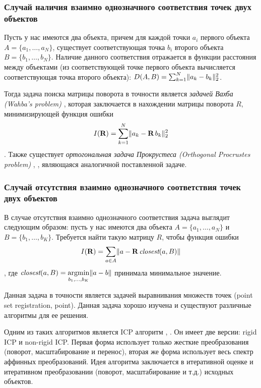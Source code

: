 \subsubsection{Случай наличия взаимно однозначного соответствия точек двух объектов}
Пусть у нас имеются два объекта, причем для каждой точки $a_{i}$ первого объекта $A = \{a_{1}, \ldots, a_{N}\}$, существует соответствующая точка $b_{i}$ второго объекта $B = \{b_{1}, \ldots, b_{N}\}$. Наличие данного соответствия отражается в функции расстояния между объектами (из соответствующей точке первого объекта вычисляется соответствующая точка второго объекта): $D(A, B) = \sum_{k=1}^{N}  \lVert a_{k} - b_{k}\rVert_{2}^{2}$. 

Тогда задача поиска матрицы поворота в точности является \textit{задачей Вахба (Wahba's problem)} \cite{wahba}, которая заключается в нахождении матрицы поворота $R$, минимизирующей функция ошибки \[I(\textbf{R}) = \sum_{k=1}^{N}  \lVert a_{k} - \textbf{R} \, b_{k}\rVert_{2}^{2} \]. Также существует \textit{ортогональная задача Прокрустеса (Orthogonal Procrustes problem)} \cite{procrustes-1}, \cite{procrustes-2}, являющаяся аналогичной поставленной задаче.

\subsubsection{Случай отсутствия взаимно однозначного соответствия точек двух объектов}

В случае отсутствия взаимно однозначного соответствия задача выглядит следующим образом: пусть у нас имеются два объекта $A = \{a_{1}, \ldots, a_{N}\}$ и $B = \{b_{1}, \ldots, b_{K}\}$. Требуется найти такую матрицу $R$, чтобы функция ошибки \[I(\textbf{R}) = \sum\limits_{a \in A} \lVert a - \textbf{R} \, \textit{closest}(a, B)\rVert \], где $\textit{closest}(a, B) = \operatorname*{argmin}\limits_{b_{1}, \dots , b_{K}} \lVert a - b\rVert$ принимала минимальное значение.


Данная задача в точности является задачей выравнивания множеств точек (point set registration, point). Данная задача хорошо изучена и существуют различные алгоритмы для ее решения.

Одним из таких алгоритмов является ICP алгоритм \cite{icp-main}, \cite{icp-2}. Он имеет две версии: rigid ICP и non-rigid ICP. Первая форма использует только жесткие преобразования (поворот, масштабирование и перенос), вторая же форма использует весь спектр аффинных преобразований. Идея алгоритма заключается в итеративной оценке и итеративном преобразовании (поворот, масштабирование и т.д.) исходных объектов.

